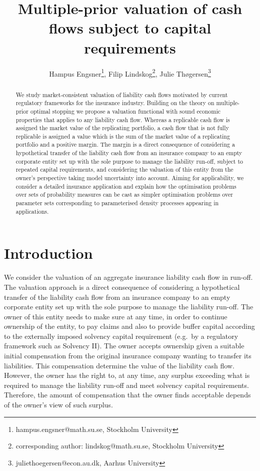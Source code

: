 \documentclass[11pt,a4paper]{article}
\title{Multiple-prior valuation of cash flows subject to capital requirements}
\author{Hampus Engsner\footnote{hampus.engsner@math.su.se, Stockholm University}, Filip Lindskog\footnote{corresponding author: lindskog@math.su.se, Stockholm University}, Julie Th{\o}gersen\footnote{juliethoegersen@econ.au.dk, Aarhus University}}
\begin{document}
\maketitle
\begin{abstract}
We study market-consistent valuation of liability cash flows motivated by current regulatory frameworks for the insurance industry. Building on the theory on multiple-prior optimal stopping we propose a  valuation functional with sound economic properties that applies to any liability cash flow. 
Whereas a replicable cash flow is assigned the market value of the replicating portfolio, a cash flow that is not fully replicable is assigned a value which is the sum of the market value of a replicating portfolio and a positive margin. 
The margin is a direct consequence of considering a hypothetical transfer of the liability cash flow from an insurance company to an empty corporate entity set up with the sole purpose to manage the liability run-off, subject to repeated capital requirements, and considering the valuation of this entity from the owner's perspective taking model uncertainty into account. 
Aiming for applicability, we consider a detailed insurance application and explain how the optimisation problems over sets of probability measures can be cast as simpler optimisation problems over parameter sets corresponding to parameterised density processes appearing in applications. 
\end{abstract}



\section{Introduction}\label{intro}

We consider the valuation of an aggregate insurance liability cash flow in run-off. The valuation approach is a direct consequence of considering a hypothetical transfer of the liability cash flow from an insurance company to an empty corporate entity set up with the sole purpose to manage the liability run-off. The owner of this entity needs to make sure at any time, in order to continue ownership of the entity, to pay claims and also to provide buffer capital according to the externally imposed  solvency capital requirement (e.g.~by a regulatory framework such as Solvency II). The owner accepts ownership given a suitable initial compensation from the original insurance company wanting to transfer its liabilities. This compensation determine the value of the liability cash flow. However, the owner has the right to, at any time, any surplus exceeding what is required to manage the liability run-off and meet solvency capital requirements. Therefore, the amount of compensation that the owner finds acceptable depends of the owner's view of such surplus.  
\end{document}
